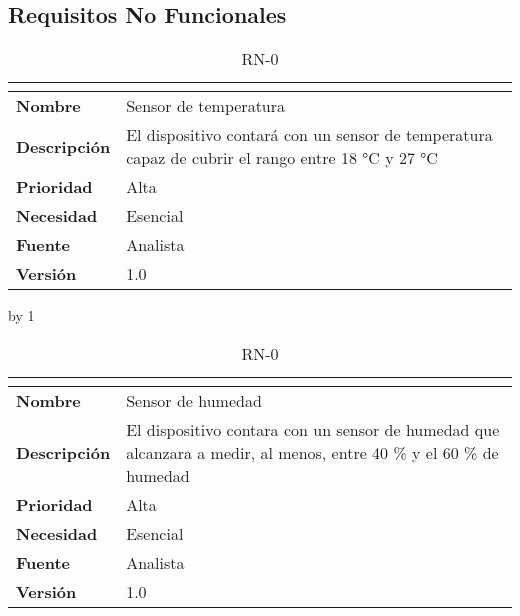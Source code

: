 \subsection{Requisitos No Funcionales}
\newcount\rn
{}
\begin{table}[H]
	\caption{RN-0\number\rn}
	\begin{tabular}{|l|p{}|}
		\hline
		\multicolumn{2}{|c|}{\cellcolor[HTML]{BFBFBF}{\color[HTML]{000000} \textbf{RN-0\number\rn}}} \\ \hline
		\textbf{Nombre}      & Sensor de temperatura                                                                            \\ \hline
		\textbf{Descripción} & El dispositivo contará con un sensor de temperatura capaz de cubrir el rango entre 18 °C y 27 °C \\ \hline
		\textbf{Prioridad}   & Alta                                                                                             \\ \hline
		\textbf{Necesidad}   & Esencial                                                                                         \\ \hline
		\textbf{Fuente}      & Analista                                                                                         \\ \hline
		\textbf{Versión}     & 1.0                                                                                              \\ \hline
	\end{tabular}
\end{table}
\advance\rn by 1
\begin{table}[H]
	\caption{RN-0\number\rn}
	\begin{tabular}{|l|p{}|}
		\hline
		\multicolumn{2}{|c|}{\cellcolor[HTML]{BFBFBF}{\color[HTML]{000000} \textbf{RN-0\number\rn}}} \\ \hline
		\textbf{Nombre}      & Sensor de humedad                                                                                                  \\ \hline
		\textbf{Descripción} & El dispositivo contara con un sensor de humedad que alcanzara a medir, al menos, entre 40 \% y el 60 \% de humedad \\ \hline
		\textbf{Prioridad}   & Alta                                                                                                               \\ \hline
		\textbf{Necesidad}   & Esencial                                                                                                           \\ \hline
		\textbf{Fuente}      & Analista                                                                                                           \\ \hline
		\textbf{Versión}     & 1.0                                                                                                                \\ \hline
	\end{tabular}
\end{table}
